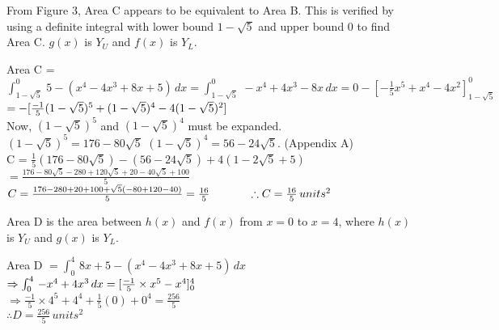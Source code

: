 \documentclass{homework}
\begin{document}
\begin{center}
    From Figure 3, Area C appears to be equivalent to Area B. This is verified by using a definite integral with lower bound $1-\sqrt{5}$ and upper bound $0$ to find Area C. $g(x)$ is $Y_U$ and $f(x)$ is $Y_L$. \vspace{0.9em}\\
\end{center}
\begin{flushleft}
Area C = $ \int_{1-\sqrt{5}}^0 \, 5-(x^4-4x^3+8x+5) \, dx 
    =\int_{1-\sqrt{5}}^0 \,-x^4+4x^3-8x \, dx =0-[-\frac{1}{5}x^5+x^4-4x^2]_{1-\sqrt{5}}^{0}$
    \vspace{0.5em}\\
    $ = - [\frac{-1}{5} (1-\sqrt{5})^5+(1-\sqrt{5})^4-4(1-\sqrt{5})^2] \vspace{0.5em}$ \vspace{0.4em}\\
    Now, $(1-\sqrt{5})^5$ and $(1-\sqrt{5})^4$ must be expanded. \vspace{0.4em}\\
    $(1-\sqrt{5})^5=176-80\sqrt{5}$ \hspace{4em} $(1-\sqrt{5})^4=56-24\sqrt{5}$. \hspace{4em} (Appendix A)
    \vspace{0.8em}\\
    C = $\frac{1}{5}(176-80\sqrt{5})-(56-24\sqrt{5})+4(1-2\sqrt{5}+5)$
    $=\frac{176-80\sqrt{5}-280+120\sqrt{5}+20-40\sqrt{5}+100}{5}$ \vspace{0.5em} \\
    $C=\frac{176-280+20+100+\sqrt{5}(-80+120-40)}{5}=\frac{16}{5} \hspace{3.4em} \therefore C= \frac{16}{5} \, units^2$ \vspace{1em} \\
\end{flushleft} 
\begin{center}
     Area D is the area between $h(x)$ and $f(x)$ from $x=0$ to $x=4$, where $h(x)$ is $Y_U$ and $g(x)$ is $Y_L$. \\
\end{center}
\begin{flushleft}
\vspace{0.3em}
   Area D $=\int_0^4 \, 8x+5-(x^4-4x^3+8x+5) \, dx $\\
   $\Rightarrow \int_0^4 \, -x^4+4x^3 \, dx  = [\frac{-1}{5}\times x^5-x^4]_0^4 \vspace{0.3em}$ 
   \\
   $\Rightarrow 
   \frac{-1}{5}\times 4^5+4^4 +\frac{1}{5}(0)+0^4=\frac{256}{5}$ \vspace{0.3em}\\
   $\therefore D=\frac{256}{5} \, units^2$ \\
\end{flushleft} 
\end{document}
